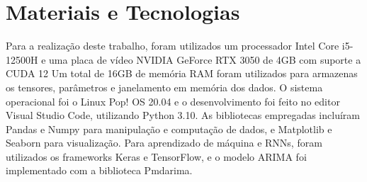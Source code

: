 \section{Materiais e Tecnologias} \label{sec:materiais}
Para a realização deste trabalho, 
foram utilizados um processador Intel Core i5-12500H e
uma placa de vídeo NVIDIA GeForce RTX 3050 de 4GB com suporte a CUDA 12
Um total de 16GB de memória RAM foram utilizados para armazenas os tensores, parâmetros e janelamento em memória dos dados. 
O sistema operacional foi o Linux Pop! OS 20.04 e o desenvolvimento foi feito no editor Visual Studio Code, utilizando Python 3.10. As bibliotecas empregadas incluíram Pandas e Numpy para manipulação e computação de dados, e Matplotlib e Seaborn para visualização. Para aprendizado de máquina e RNNs, foram utilizados os frameworks Keras e TensorFlow, e o modelo ARIMA foi implementado com a biblioteca Pmdarima.